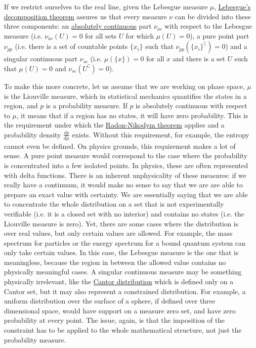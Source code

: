 If we restrict ourselves to the real line, given the Lebesgue measure $\mu$, \href{https://en.wikipedia.org/wiki/Lebesgue%27s_decomposition_theorem}{Lebesgue's decomposition theorem} assures us that every measure $\nu$ can be divided into these three components: an \href{https://en.wikipedia.org/wiki/Absolute_continuity#Absolute_continuity_of_measures}{absolutely continuous} part $\nu_{ac}$ with respect to the Lebesgue measure (i.e. $\nu_{ac}(U)=0$ for all sets $U$ for which $\mu(U)=0$), a pure point part $\nu_{pp}$ (i.e. there is a set of countable points $\{x_i\}$ such that $\nu_{pp}(\{x_i\}^{\complement})=0$) and a singular continuous part $\nu_{sc}$ (i.e. $\mu(\{x\})=0$ for all $x$ and there is a set $U$ such that $\mu(U)=0$ and $\nu_{sc}(U^{\complement})=0$).

To make this more concrete, let us assume that we are working on phase space, $\mu$ is the Liouville measure, which in statistical mechanics quantifies the states in a region, and $p$ is a probability measure. If $p$ is absolutely continuous with respect to $\mu$, it means that if a region has no states, it will have zero probability. This is the requirement under which the \href{https://en.wikipedia.org/wiki/Radon%E2%80%93Nikodym_theorem}{Radon-Nikodym theorem} applies and a probability density $\frac{dp}{d\mu}$ exists. Without this requirement, for example, the entropy cannot even be defined. On physics grounds, this requirement makes a lot of sense. A pure point measure would correspond to the case where the probability is concentrated into a few isolated points. In physics, these are often represented with delta functions. There is an inherent unphysicality of these measures: if we really have a continuum, it would make no sense to say that we are are able to prepare an exact value with certainty. We are essentially saying that we are able to concentrate the whole distribution on a set that is not experimentally verifiable (i.e. it is a closed set with no interior) and contains no states (i.e. the Liouville measure is zero). Yet, there are some cases where the distribution is over real values, but only certain values are allowed. For example, the mass spectrum for particles or the energy spectrum for a bound quantum system can only take certain values. In this case, the Lebesgue measure is the one that is meaningless, because the region in between the allowed value contains no physically meaningful cases. A singular continuous measure may be something physically irrelevant, like the \href{https://en.wikipedia.org/wiki/Cantor_distribution}{Cantor distribution} which is defined only on a Cantor set, but it may also represent a constrained distribution. For example, a uniform distribution over the surface of a sphere, if defined over three dimensional space, would have support on a measure zero set, and have zero probability at every point. The issue, again, is that the imposition of the constraint has to be applied to the whole mathematical structure, not just the probability measure.

